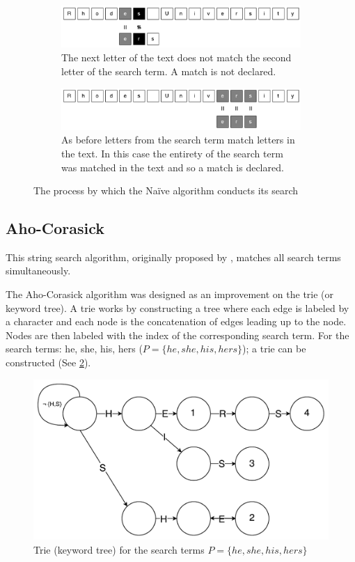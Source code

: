 \documentclass{article}
\begin{document}
\begin{figure}[h!bt]
  \begin{subfigure}{\textwidth}
  \makeatletter
  \includegraphics[width=\textwidth]{images/naive-4}
  \caption{The next letter of the text does not match the second letter of the search term. A match is not declared.}
  \end{subfigure}
  
  \begin{subfigure}{\textwidth}
  \makeatletter
  \includegraphics[width=\textwidth]{images/naive-5}
  \caption{As before letters from the search term match letters in the text. In this case the entirety of the search term was matched in the text and so a match is declared.}
  \end{subfigure}
  
  \caption{The process by which the Na{\"i}ve algorithm conducts its search}
  \label{fig:naive}
\end{figure}

\subsection{Aho-Corasick}
This string search algorithm, originally proposed by \cite{Aho1975}, matches all search terms simultaneously.

The Aho-Corasick algorithm was designed as an improvement on the trie (or keyword tree). A trie works by constructing a tree where each edge is labeled by a character and each node is the concatenation of edges leading up to the node. Nodes are then labeled with the index of the corresponding search term. For the search terms: he, she, his, hers (\(P = \{he, she, his, hers\}\)); a trie can be constructed (See \ref{fig:trie}).

\begin{figure}[h!bt]
  \label{fig:trie}
  \centering
  \makeatletter
  \includegraphics[width=\textwidth]{images/trie.pdf}
  \caption{Trie (keyword tree) for the search terms \(P = \{he, she, his, hers\}\)}
\end{figure}
\end{document}
